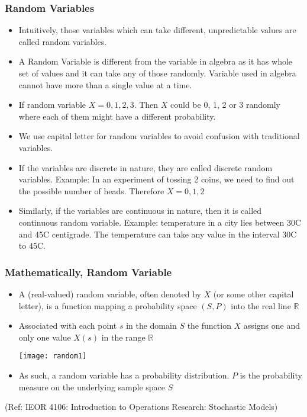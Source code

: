 \begin{frame}\frametitle{Random Variables}
\begin{itemize}

\item Intuitively, those variables which can take different, unpredictable values are called
random variables.
\item A Random Variable is different from the variable in algebra as it has whole set of values and it can take any of those randomly. Variable used in algebra cannot have more than a single value at a time.
\item If random variable $X={0,1,2,3}$. Then $X$ could be 0, 1, 2 or 3 randomly where each of them might have a different probability.
\item We use capital letter for random variables to avoid confusion with traditional variables.
\item If the variables are discrete in nature, they are called discrete random
variables. Example: In an experiment of tossing 2 coins, we need to find out the possible number of heads. Therefore $X= {0, 1, 2}$
\item Similarly, if the variables are continuous in nature, then it is called
continuous random variable. Example: temperature in a city lies between 30C and 45C centigrade. The temperature can take any value in the interval 30C to 45C.
\end{itemize}
\end{frame}

\begin{frame}\frametitle{Mathematically, Random Variable}
\begin{itemize}

\item A (real-valued) random variable, often denoted by $X$ (or some other capital letter), is a function mapping a probability space $(S, P)$ into the real line ${\mathbb R}$
\item Associated with each point $s$ in the domain $S$ the function $X$ assigns one and only one value $X(s)$ in the range ${\mathbb R}$

\begin{center}
\texttt{[image: random1]}
\end{center}

\item As such, a random variable has a probability distribution. $P$ is the probability measure on the underlying sample space $S$
\end{itemize}

\tiny{(Ref: IEOR 4106: Introduction to Operations Research: Stochastic Models)}

\end{frame}

